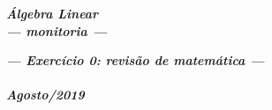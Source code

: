 \documentclass[pdftex, brazil, 12pt, oneside, addpoints]{exam}
\begin{document}
\begin{coverpages}

\begin{center}
\textbf{\textit{\Large%
Álgebra Linear\\
--- monitoria ---}}
\end{center}

\vspace{1cm}

\begin{figure}[H]
\begin{center}
\end{center}
\end{figure}

\vspace{1cm}

\begin{center}
\textit{\textbf{\Large%
--- Exercício 0: revisão de matemática ---\\
\ \\
Agosto/2019}}
\end{center}



\end{coverpages}
\end{document}
